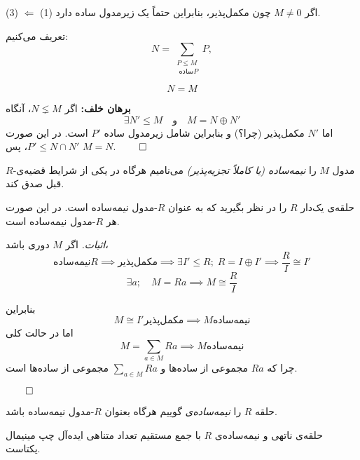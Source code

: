 \begin{frame}

    (3) \(\Leftarrow\) (1) اگر \( M \neq 0 \) چون مکمل‌پذیر، بنابراین حتماً یک زیرمدول ساده دارد.

    تعریف می‌کنیم:
    \[
        N = \sum_{\substack{P \leqslant M \\  \text{ ساده} P}} P,
    \]
    \begin{claim}
        \[N = M\]
    \end{claim}

    \textbf{برهان خلف:}
    اگر \( N \lneq M \)، آنگاه
    \[
        \exists N' \leqslant M \quad \text{و} \quad M = N \oplus N'
    \]
    اما \( N' \) مکمل‌پذیر (چرا؟) و بنابراین شامل زیرمدول ساده \( P' \) است. در این صورت \( P' \leqslant N \cap N'\)، پس \( M = N \).
    \hfill 
    \(\qed\)
\end{frame}


\begin{frame}
    \begin{definition}
        \( R \)-مدول \( M \) را \textit{نیمه‌ساده (یا کاملاً تجزیه‌پذیر)} می‌نامیم هرگاه در یکی از شرایط قضیه‌ی قبل صدق کند.

    \end{definition}
    \begin{theorem}
        حلقه‌ی یک‌دار \( R \) را در نظر بگیرید که  به عنوان \( R \)-مدول نیمه‌ساده است. در این صورت هر \( R \)-مدول نیمه‌ساده است.
    \end{theorem}
    \textit{اثبات.} اگر \( M \) دوری باشد،
    \[
        \text{نیمه‌ساده} R \implies \text{مکمل‌پذیر} \implies \exists I' \leqslant R ; \; R = I \oplus I' \implies \frac{R}{I} \cong I'
    \]
    \[
        \exists a; \quad M = Ra \implies M \cong \frac{R}{I}
    \]


\end{frame}


\begin{frame}
    بنابراین
    \[
        M \cong I' \text{مکمل‌پذیر}
        \implies M \text{نیمه‌ساده}
    \]
    اما در حالت کلی
    \[
        M = \sum_{a \in M} Ra \implies M \text{نیمه‌ساده}
    \]
    چرا که
    \(Ra\)
    مجموعی از ساده‌ها و
    \(\sum_{a \in M} Ra\)
    مجموعی از ساده‌ها است.

    \hfill 
    \(\qed\)
\end{frame}

\begin{frame}
    \begin{definition}
        حلقه \( R \) را \textit{نیمه‌ساده‌ی } گوییم هرگاه بعنوان \( R \)-مدول نیمه‌ساده باشد.
    \end{definition}

    \begin{theorem}
        حلقه‌ی ناتهی و نیمه‌ساده‌ی \( R \) با جمع مستقیم تعداد متناهی ایده‌آل چپ مینیمال یکتاست.
    \end{theorem}





\end{frame}

